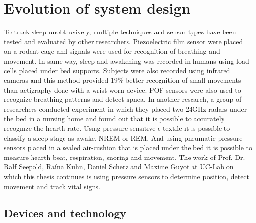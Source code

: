 \chapter{Evolution of system design}
\label{chap:evolution}

To track sleep unobtrusively, multiple techniques and sensor types have been tested and evaluated by other researchers. Piezoelectric film sensor were placed on a rodent cage and signals were used for recognition of breathing and movement\cite{piezo}. In same way, sleep and awakening was recorded in humans using load cells placed under bed supports\cite{load_cells}. Subjects were also recorded using infrared cameras and this method provided 19\% better recognition of small movements than actigraphy done with a wrist worn device\cite{video}. \ac{POF} sensors were also used to recognize breathing patterns and detect apnea\cite{optical}. In another research, a group of researchers conducted experiment in which they placed two 24\ac{GHz} radars under the bed in a nursing home and found out that it is possible to accurately recognize the hearth rate\cite{radar}. Using pressure sensitive e-textile it is possible to classify a sleep stage as awake, \ac{NREM} or \ac{REM}\cite{e-textile}. And using pneumatic pressure sensors placed in a sealed air-cushion that is placed under the bed it is possible to measure hearth beat, respiration, snoring and movement\cite{pneumatic}. The work of Prof. Dr. Ralf Seepold, Ra\'ina Kuhn, Daniel Scherz and Maxime Guyot at \ac{UC-Lab}\cite{Kuhn}\cite{Guyot} on which this thesis continues is using pressure sensors to determine position, detect movement and track vital signs.

\section{Devices and technology}

